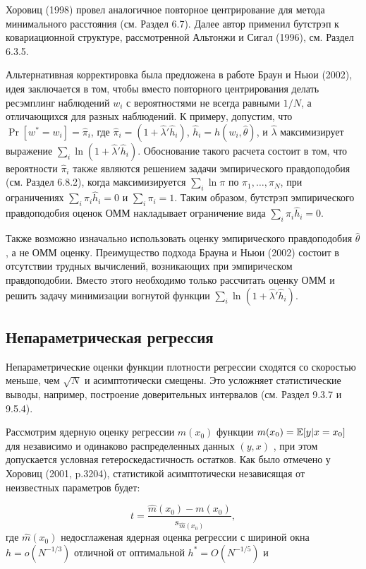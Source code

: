 Хоровиц (1998) провел аналогичное повторное центрирование для метода минимального расстояния (см. Раздел 6.7). Далее автор применил бутстрэп к ковариационной структуре, рассмотренной Альтонжи и Сигал (1996), см. Раздел 6.3.5.

Альтернативная корректировка была предложена в работе Браун и Ньюи (2002), идея заключается в том, чтобы вместо повторного центрирования делать ресэмплинг наблюдений $w_i$ с вероятностями не всегда равными $1/N$, а отличающихся для разных наблюдений. К примеру, допустим, что $\Pr[w^{*}=w_i]=\hat{\pi}_i$, где $\hat{\pi}_i=(1+\hat{\lambda}'\hat{h}_i)$, $\hat{h}_i=h(w_i,\hat{\theta})$, и $\hat{\lambda}$ максимизирует выражение $\sum_{i}\ln(1+\hat{\lambda}'\hat{h}_i)$. Обоснование такого расчета состоит в том, что вероятности $\hat{\pi}_i$ также являются решением задачи эмпирического правдоподобия (см. Раздел 6.8.2), когда максимизируется $\sum_{i}\ln{\pi}$ по $\pi_1,\ldots ,\pi_N$, при ограничениях $\sum_{i}\pi_{i}\hat{h}_i=0$ и $\sum_{i}\pi_{i}=1$. Таким образом, бутстрэп эмпирического правдоподобия оценок ОММ накладывает ограничение вида $\sum_{i}\hat{\pi}_{i}\hat{h}_{i}=0$.

Также возможно изначально использовать оценку эмпирического правдоподобия $\hat{\theta}$, а не ОММ оценку. Преимущество подхода Брауна и Ньюи (2002) состоит в отсутствии трудных вычислений, возникающих при эмпирическом правдоподобии. Вместо этого  необходимо только рассчитать оценку ОММ и решить задачу  минимизации  вогнутой функции $\sum_{i}\ln(1+\hat{\lambda}'\hat{h}_i)$. 

\subsection{Непараметрическая регрессия}

Непараметрические оценки функции плотности  регрессии сходятся со скоростью меньше, чем $\sqrt{N}$ и асимптотически смещены. Это усложняет статистические выводы, например, построение доверительных интервалов (см. Раздел 9.3.7 и 9.5.4).

Рассмотрим ядерную оценку регрессии $\hat{m}(x_0)$ функции $m(x_0)=\mathbb{E}[y|x=x_0]$ для независимо и одинаково распределенных данных $(y,x)$ , при этом допускается условная гетероскедастичность остатков. Как было отмечено у Хоровиц (2001, p.3204),  статистикой асимптотически независящая от неизвестных параметров будет:

\[
t=\dfrac{\hat{m}(x_0)-m(x_0)}{s_{\hat{m}(x_0)}},
\] 
где $\hat{m}(x_0)$ недосглаженая ядерная оценка  регрессии с шириной окна $h=o(N^{-1/3})$ отличной от оптимальной $h^{*}=O(N^{-1/5})$ и 

